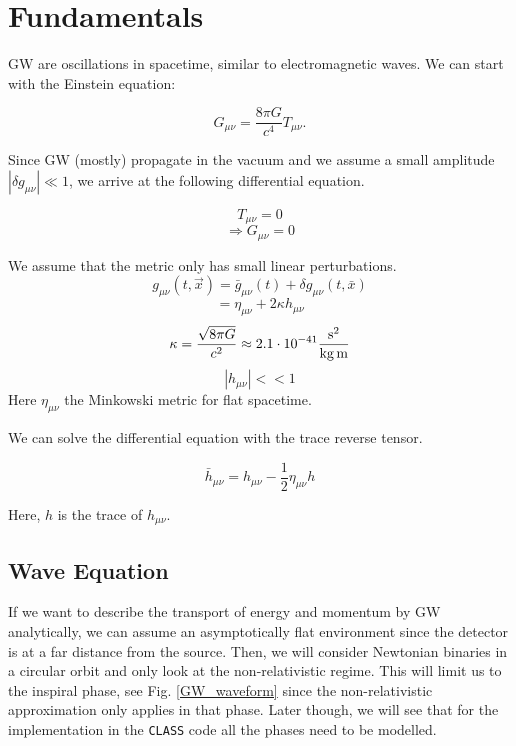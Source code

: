 \section{Fundamentals}
\label{gw_fundamentals}
GW are oscillations in spacetime, similar to electromagnetic
waves. We can start with the Einstein equation:

\begin{equation}
    G_{\mu\nu}= \frac{8\pi G}{c^4} T_{\mu\nu}.
\end{equation}

Since GW (mostly) propagate in the vacuum and we assume a small amplitude $|\delta g_{\mu\nu}| \ll 1$, we arrive at the following differential equation.

\begin{equation}
    T_{\mu\nu} = 0
\end{equation}
\begin{equation}
    \Rightarrow G_{\mu\nu} = 0
\end{equation}


We assume that the metric only has small linear perturbations. 
\begin{equation}
    g_{\mu \nu}(t, \vec{x}) = \bar{g}_{\mu \nu}(t) + \delta g_{\mu \nu}(t, \bar{x})
\end{equation}
\begin{equation}
   = \eta_{\mu \nu} + 2\kappa h_{\mu \nu}
\end{equation}
\begin{equation}
    \kappa = \frac{\sqrt{8\pi G}}{c^2} \approx 2.1 \cdot 10^{-41}\frac{\rm{s}^2}{\rm{kg}\,\rm{ m}}
\end{equation}
\begin{equation}
    |h_{\mu \nu}| << 1
\end{equation}
Here $\eta_{ \mu \nu}$ the Minkowski metric for flat spacetime.

We can solve the differential equation with the trace reverse tensor.

\begin{equation}
    \bar{h}_{\mu\nu} = h_{\mu\nu}-\frac{1}{2} \eta_{\mu\nu}h
    \label{trace_reverse}
\end{equation}

Here, $h$ is the trace of $h_{\mu\nu}$.

\subsection{Wave Equation}

If we want to describe the transport of energy and momentum by GW analytically, we can assume an asymptotically flat environment since the detector is at a far distance from the source. Then, we will consider Newtonian binaries in a circular orbit and only look at the non-relativistic regime. This will limit us to the inspiral phase, see Fig. \ref{GW_waveform} since the non-relativistic approximation only applies in that phase. Later though, we will see that for the implementation in the {\tt CLASS} code all the phases need to be modelled.

